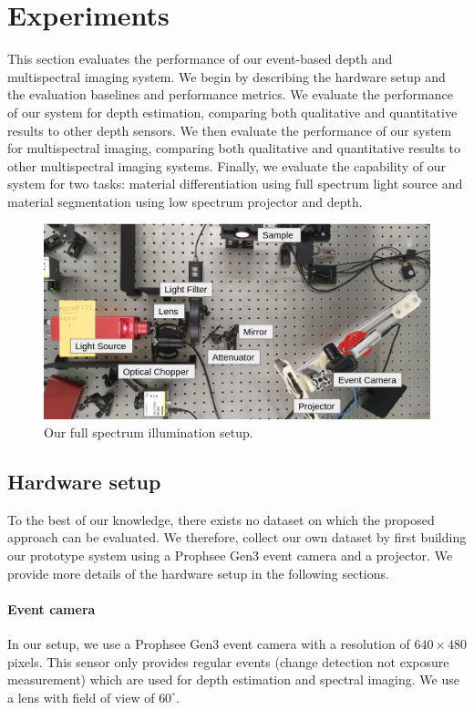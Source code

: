 \section{Experiments}
This section evaluates the performance of our event-based depth and multispectral imaging system.
We begin by describing the hardware setup and the evaluation baselines and performance metrics.
We evaluate the performance of our system for depth estimation, comparing both qualitative and quantitative results to other depth sensors.
We then evaluate the performance of our system for multispectral imaging, comparing both qualitative and quantitative results to other multispectral imaging systems.
Finally, we evaluate the capability of our system for two tasks: material differentiation using full spectrum light source and material segmentation using  low spectrum projector and depth.
% 
\begin{figure}
    \centering
    \includegraphics[width=.5\textwidth]{resources/images/multi-spectral/experiment_setup.png}
    \caption{Our full spectrum illumination setup.}
    \label{fig:generalSetup}
\end{figure}

\subsection{Hardware setup}
To the best of our knowledge, there exists no dataset on which the proposed approach can be evaluated.
We therefore, collect our own dataset by first building our prototype system using a Prophsee Gen3 event camera \cite{} and a projector.
We provide more details of the hardware setup in the following sections.

\paragraph{Event camera}
In our setup, we use a Prophsee Gen3 event camera \cite{Posch11ssc} with a resolution of $640\times480$ pixels.
This sensor only provides regular events (change detection not exposure measurement) which are used for depth estimation and spectral imaging.
We use a lens with field of view of $60^\circ$.

